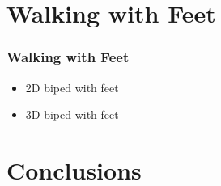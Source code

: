 \documentclass{beamer}
\begin{document}


\section{Walking with Feet}
\begin{frame}
  \frametitle{Walking with Feet}
  \begin{itemize}
  \item 2D biped with feet
  \item 3D biped with feet
  \end{itemize}
\end{frame}

\section{Conclusions}

%
%
%

\end{document}
